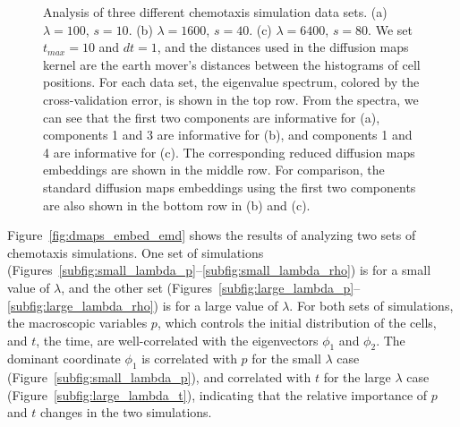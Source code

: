 \begin{figure}[t]
\begin{subfigure}[t]{2in}
\caption{}
\end{subfigure}
%
\caption{Analysis of three different chemotaxis simulation data sets. (a) $\lambda = 100$, $s = 10$. (b) $\lambda = 1600$, $s = 40$. (c) $\lambda = 6400$, $s = 80$. We set $t_{max} = 10$ and $dt=1$, and the distances used in the diffusion maps kernel are the earth mover's distances between the histograms of cell positions. For each data set, the eigenvalue spectrum, colored by the cross-validation error, is shown in the top row. From the spectra, we can see that the first two components are informative for (a), components 1 and 3 are informative for (b), and components 1 and 4 are informative for (c). The corresponding reduced diffusion maps embeddings are shown in the middle row. For comparison, the standard diffusion maps embeddings using the first two components are also shown in the bottom row in (b) and (c).}
%
\label{fig:chemotaxis_simulations_harmonics}
\end{figure}

Figure~\ref{fig:dmaps_embed_emd} shows the results of analyzing two sets of chemotaxis simulations.
%
One set of simulations (Figures~\ref{subfig:small_lambda_p}--\ref{subfig:small_lambda_rho}) is for a small value of $\lambda$, and the other set (Figures~\ref{subfig:large_lambda_p}--\ref{subfig:large_lambda_rho}) is for a large value of $\lambda$.
%
For both sets of simulations, the macroscopic variables $p$, which controls the initial distribution of the cells, and $t$, the time, are well-correlated with the eigenvectors $\phi_1$ and $\phi_2$.
%
%
The dominant coordinate $\phi_1$ is correlated with $p$ for the small $\lambda$ case (Figure~\ref{subfig:small_lambda_p}), and correlated with $t$ for the large $\lambda$ case (Figure~\ref{subfig:large_lambda_t}), indicating that the relative importance of $p$ and $t$ changes in the two simulations.
%


